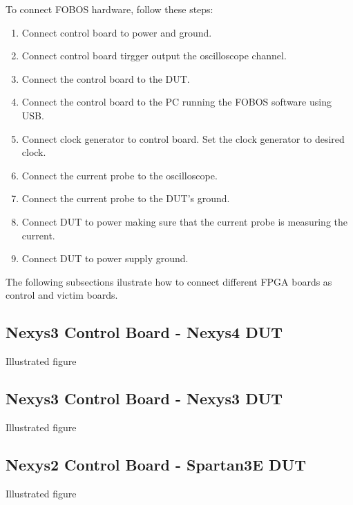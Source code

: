 To connect FOBOS hardware, follow these steps:
  \begin{enumerate}
  \item Connect control board to power and ground.
  \item Connect control board tirgger output the oscilloscope channel.
  \item Connect the control board to the DUT.
  \item Connect the control board to the PC running the FOBOS software using USB.
  \item Connect clock generator to control board. Set the clock generator to desired clock.
  \item Connect the current probe to the oscilloscope.
  \item Connect the current probe to the DUT's ground.
  \item Connect DUT to power making sure that the current probe is measuring the current.
  \item Connect DUT to power supply ground.
  \end{enumerate}
  
The following subsections ilustrate how to connect different FPGA boards as control and victim boards.

\subsection{Nexys3 Control Board - Nexys4 DUT}
Illustrated figure 
\subsection{Nexys3 Control Board - Nexys3 DUT}
Illustrated figure
\subsection{Nexys2 Control Board - Spartan3E DUT}
Illustrated figure